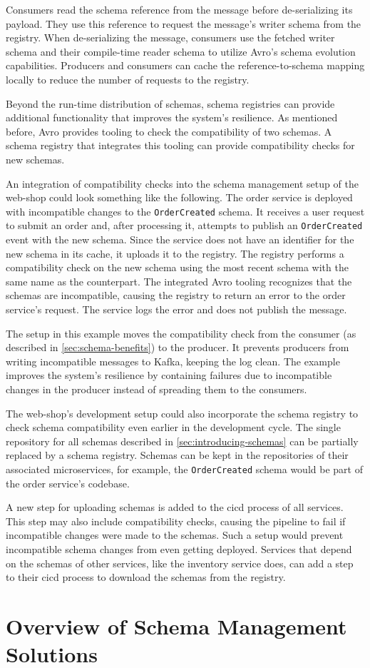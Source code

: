 Consumers read the schema reference from the message before de-serializing its payload.
They use this reference to request the message's writer schema from the registry.
When de-serializing the message, consumers use the fetched writer schema and their compile-time reader schema to utilize Avro's schema evolution capabilities.
Producers and consumers can cache the reference-to-schema mapping locally to reduce the number of requests to the registry.

Beyond the run-time distribution of schemas, schema registries can provide additional functionality that improves the system's resilience.
As mentioned before, Avro provides tooling to check the compatibility of two schemas.
A schema registry that integrates this tooling can provide compatibility checks for new schemas.

An integration of compatibility checks into the schema management setup of the web-shop could look something like the following.
The order service is deployed with incompatible changes to the \texttt{OrderCreated} schema.
It receives a user request to submit an order and, after processing it, attempts to publish an \texttt{OrderCreated} event with the new schema.
Since the service does not have an identifier for the new schema in its cache, it uploads it to the registry.
The registry performs a compatibility check on the new schema using the most recent schema with the same name as the counterpart.
The integrated Avro tooling recognizes that the schemas are incompatible, causing the registry to return an error to the order service's request.
The service logs the error and does not publish the message.

The setup in this example moves the compatibility check from the consumer (as described in \ref{sec:schema-benefits}) to the producer.
It prevents producers from writing incompatible messages to Kafka, keeping the log clean.
The example improves the system's resilience by containing failures due to incompatible changes in the producer instead of spreading them to the consumers.

The web-shop's development setup could also incorporate the schema registry to check schema compatibility even earlier in the development cycle.
The single repository for all schemas described in \ref{sec:introducing-schemas} can be partially replaced by a schema registry.
Schemas can be kept in the repositories of their associated microservices, for example, the \texttt{OrderCreated} schema would be part of the order service's codebase.

A new step for uploading schemas is added to the \gls{cicd} process of all services.
This step may also include compatibility checks, causing the pipeline to fail if incompatible changes were made to the schemas.
Such a setup would prevent incompatible schema changes from even getting deployed.
Services that depend on the schemas of other services, like the inventory service does, can add a step to their \gls{cicd} process to download the schemas from the registry.

\section{Overview of Schema Management Solutions}
